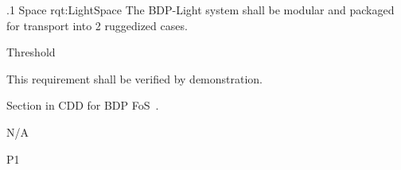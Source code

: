 
\ONERQMTVKSA
{\RqtNumberBase.1}
{Space}
{rqt:LightSpace}
{The BDP-Light system shall be modular and packaged for transport into 2 ruggedized cases.}
{
	\item [Phase 1] Threshold
}
{This requirement shall be verified by demonstration.}
{
\item [5.5.8] Section in CDD for BDP FoS~\cite{ref__BDP_FOS_CDD}.
}
{
	\item N/A
}
{P1}

